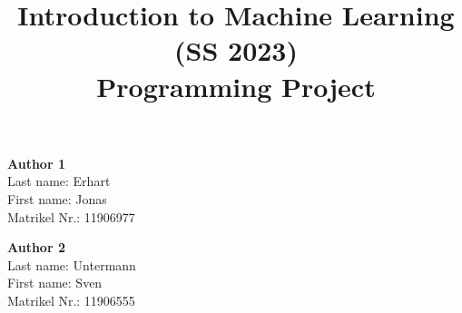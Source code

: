 \documentclass[a4, 10 pt, conference]{ieeeconf}  %
\title{\LARGE \bf
Introduction to Machine Learning (SS 2023)\\ Programming Project
\vspace{-3em}
}
\begin{document}
\maketitle
\vspace{-3em}
\thispagestyle{empty}
\pagestyle{empty}

\begin{strip}
\begin{tcolorbox}[
size=tight,
colback=white,
boxrule=0.2mm,
left=3mm,right=3mm, top=3mm, bottom=1mm
]
{\begin{multicols}{3}%

\textbf{Author 1}       \\
Last name:	Erhart            \\  %
First name:	Jonas           \\  %
Matrikel Nr.: 	11906977             \\  %

\columnbreak

\textbf{Author 2}       \\ 
Last name:	Untermann            \\  %
First name:	Sven          \\  %
Matrikel Nr.:	11906555           \\  %

\columnbreak


\end{multicols}}
\end{tcolorbox}
\end{strip}



\end{document}
